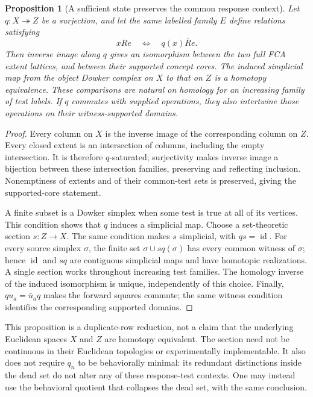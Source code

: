 \documentclass[11pt]{article}
\newtheorem{proposition}[theorem]{Proposition}
\theoremstyle{definition}\newtheorem{definition}[theorem]{Definition}
\theoremstyle{remark}\newtheorem{remark}[theorem]{Remark}
\newcommand{\id}{\operatorname{id}}
\begin{document}
\begin{proposition}[A sufficient state preserves the common response context]
\label{prop:reduction}
Let $q:X\twoheadrightarrow Z$ be a surjection, and let the same labelled
family $E$ define relations satisfying
\[
 xRe\quad\Longleftrightarrow\quad q(x)\overline R e.
\]
Then inverse image along $q$ gives an isomorphism between the two full FCA
extent lattices, and between their supported concept cores. The induced
simplicial map from the object Dowker complex on $X$ to that on $Z$ is a
homotopy equivalence. These comparisons are natural on homology for an
increasing family of test labels. If $q$ commutes with supplied operations,
they also intertwine those operations on their witness-supported domains.
\end{proposition}
\begin{proof}
Every column on $X$ is the inverse image of the corresponding column on
$Z$. Every closed extent is an intersection of columns, including the empty
intersection. It is therefore $q$-saturated; surjectivity makes inverse
image a bijection between these intersection families, preserving and
reflecting inclusion. Nonemptiness of extents and of their common-test
sets is preserved, giving the supported-core statement.

A finite subset is a Dowker simplex when some test is true at all of its
vertices. This condition shows that $q$ induces a simplicial map. Choose
a set-theoretic section $s:Z\to X$. The same condition makes $s$ simplicial,
with $qs=\id$. For every source simplex $\sigma$, the finite set
$\sigma\cup sq(\sigma)$ has every common witness of $\sigma$; hence
$\id$ and $sq$ are contiguous simplicial maps and have homotopic
realizations. A single section works throughout increasing test families.
The homology inverse of the induced isomorphism is unique, independently
of this choice. Finally, $qu_a=\bar u_aq$ makes the forward squares commute;
the same witness condition identifies the corresponding supported domains.
\end{proof}

This proposition is a duplicate-row reduction, not a claim that the
underlying Euclidean spaces $X$ and $Z$ are homotopy equivalent. The section
need not be continuous in their Euclidean topologies or experimentally
implementable. It also does not require $q_n$ to be behaviorally minimal:
its redundant distinctions inside the dead set do not alter any of these
response-test contexts. One may instead use the behavioral quotient that
collapses the dead set, with the same conclusion.
\end{document}
